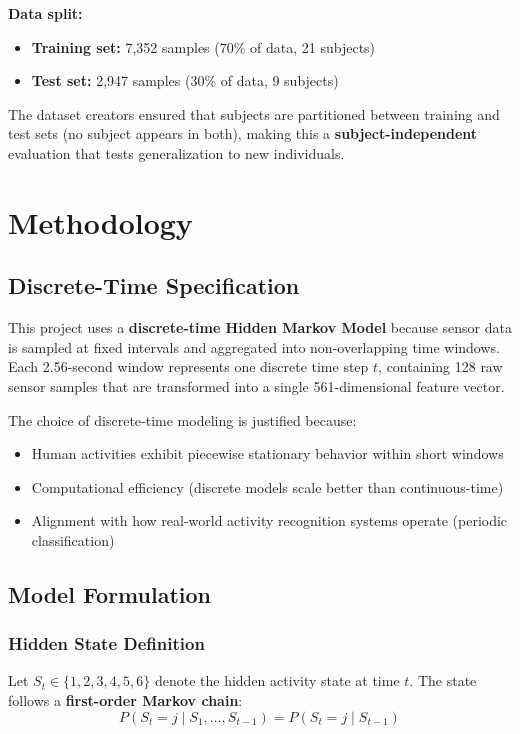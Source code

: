 \documentclass[11pt,a4paper]{article}
\begin{document}
\textbf{Data split:}
\begin{itemize}[leftmargin=*]
    \item \textbf{Training set:} 7,352 samples (70\% of data, 21 subjects)
    \item \textbf{Test set:} 2,947 samples (30\% of data, 9 subjects)
\end{itemize}

The dataset creators ensured that subjects are partitioned between training and test sets (no subject appears in both), making this a \textbf{subject-independent} evaluation that tests generalization to new individuals.

\section{Methodology}

\subsection{Discrete-Time Specification}

This project uses a \textbf{discrete-time Hidden Markov Model} because sensor data is sampled at fixed intervals and aggregated into non-overlapping time windows. Each 2.56-second window represents one discrete time step $t$, containing 128 raw sensor samples that are transformed into a single 561-dimensional feature vector.

The choice of discrete-time modeling is justified because:
\begin{itemize}[leftmargin=*]
    \item Human activities exhibit piecewise stationary behavior within short windows
    \item Computational efficiency (discrete models scale better than continuous-time)
    \item Alignment with how real-world activity recognition systems operate (periodic classification)
\end{itemize}

\subsection{Model Formulation}

\subsubsection{Hidden State Definition}

Let $S_t \in \{1, 2, 3, 4, 5, 6\}$ denote the hidden activity state at time $t$. The state follows a \textbf{first-order Markov chain}:
\begin{equation}
P(S_t = j \mid S_1, \ldots, S_{t-1}) = P(S_t = j \mid S_{t-1})
\end{equation}
\end{document}
